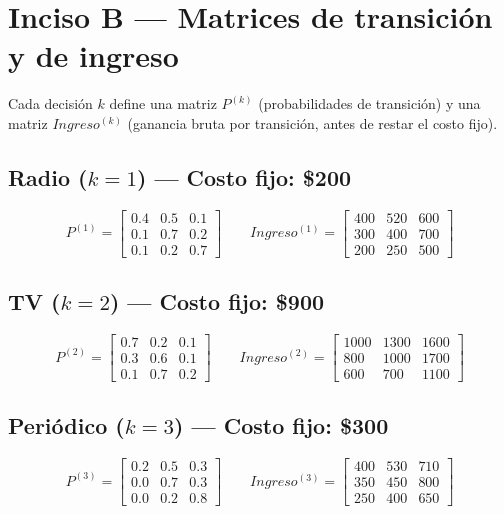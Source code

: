 \documentclass[12pt,a4paper]{article}
\begin{document}
\section{Inciso B --- Matrices de transición y de ingreso}

Cada decisión $k$ define una matriz $P^{(k)}$ (probabilidades de transición) y una matriz $Ingreso^{(k)}$ (ganancia bruta por transición, antes de restar el costo fijo).

\subsection*{Radio ($k = 1$) --- Costo fijo: \$200}

\[
P^{(1)} = \begin{bmatrix}
0.4 & 0.5 & 0.1 \\
0.1 & 0.7 & 0.2 \\
0.1 & 0.2 & 0.7
\end{bmatrix}
\qquad
Ingreso^{(1)} = \begin{bmatrix}
400 & 520 & 600 \\
300 & 400 & 700 \\
200 & 250 & 500
\end{bmatrix}
\]

\subsection*{TV ($k = 2$) --- Costo fijo: \$900}

\[
P^{(2)} = \begin{bmatrix}
0.7 & 0.2 & 0.1 \\
0.3 & 0.6 & 0.1 \\
0.1 & 0.7 & 0.2
\end{bmatrix}
\qquad
Ingreso^{(2)} = \begin{bmatrix}
1000 & 1300 & 1600 \\
800  & 1000 & 1700 \\
600  & 700  & 1100
\end{bmatrix}
\]

\subsection*{Periódico ($k = 3$) --- Costo fijo: \$300}

\[
P^{(3)} = \begin{bmatrix}
0.2 & 0.5 & 0.3 \\
0.0 & 0.7 & 0.3 \\
0.0 & 0.2 & 0.8
\end{bmatrix}
\qquad
Ingreso^{(3)} = \begin{bmatrix}
400 & 530 & 710 \\
350 & 450 & 800 \\
250 & 400 & 650
\end{bmatrix}
\]
\end{document}
